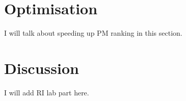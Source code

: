 \section{Optimisation}

I will talk about speeding up PM ranking in this section.

\section{Discussion}

I will add RI lab part here.

%
%
%
%

